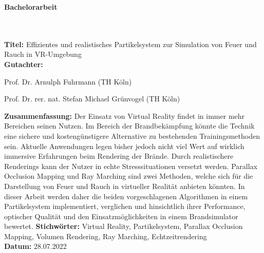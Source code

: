 \addtocounter{page}{1}

\begin{flushleft}
	\begin{huge}
		\textbf{Bachelorarbeit}
	\end{huge}
	~\\
	~\\
	\textbf{Titel:}  Effizientes und realistisches Partikelsystem zur Simulation von Feuer und Rauch in VR-Umgebung
	~\\
	\doublespacing
	\textbf{Gutachter:}
	\begin{description}
		\vspace{-0.2cm}
		\itemsep-8pt
		\item[–]
			Prof. Dr. Arnulph Fuhrmann (TH Köln)
		\item[–]
			Prof. Dr. rer. nat. Stefan Michael Grünvogel (TH Köln)
	\end{description}
	\vspace{-0.4cm}
	\singlespacing
	\textbf{Zusammenfassung:} Der Einsatz von Virtual Reality findet in immer mehr Bereichen
	seinen Nutzen. Im Bereich der Brandbekämpfung könnte die Technik eine sichere und
	kostengünstigere Alternative zu bestehenden Trainingsmethoden sein.
	Aktuelle Anwendungen legen bisher jedoch nicht viel Wert auf wirklich immersive Erfahrungen
	beim Rendering der Brände. Durch realistischere Renderings kann der Nutzer in echte Stresssituationen
	versetzt werden. Parallax Occlusion Mapping und Ray Marching sind zwei Methoden, welche sich für die
	Darstellung von Feuer und Rauch in virtueller Realität anbieten könnten.
	In dieser Arbeit werden daher die beiden vorgeschlagenen Algorithmen in einem Partikelsystem implementiert, verglichen und
	hinsichtlich ihrer Performance, optischer Qualität und den Einsatzmöglichkeiten in einem Brandsimulator bewertet.
	\singlespacing
	\textbf{Stichwörter:} Virtual Reality, Partikelsystem, Parallax Occlusion Mapping, Volumen Rendering, Ray Marching, Echtzeitrendering\\
	\doublespacing
	\textbf{Datum:} 28.07.2022


	\vspace{1cm}


\end{flushleft}
